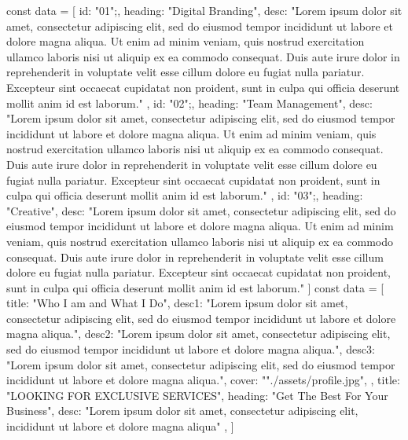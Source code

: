 const data = [
{
    id: "01";,
    heading: "Digital Branding",
    desc: "Lorem ipsum dolor sit amet, consectetur adipiscing elit, 
    sed do eiusmod tempor incididunt ut labore et dolore magna aliqua. 
    Ut enim ad minim veniam, quis nostrud exercitation ullamco laboris nisi 
    ut aliquip ex ea commodo consequat. Duis aute irure dolor in reprehenderit
     in voluptate velit esse cillum dolore eu fugiat nulla pariatur. 
     Excepteur sint occaecat cupidatat non proident, sunt in culpa qui
      officia deserunt mollit anim id est laborum."
},
{
    id: "02";,
    heading: "Team Management",
    desc: "Lorem ipsum dolor sit amet, consectetur adipiscing elit, 
    sed do eiusmod tempor incididunt ut labore et dolore magna aliqua. 
    Ut enim ad minim veniam, quis nostrud exercitation ullamco laboris nisi 
    ut aliquip ex ea commodo consequat. Duis aute irure dolor in reprehenderit
     in voluptate velit esse cillum dolore eu fugiat nulla pariatur. 
     Excepteur sint occaecat cupidatat non proident, sunt in culpa qui
      officia deserunt mollit anim id est laborum."
},
{
    id: "03";,
    heading: "Creative",
    desc: "Lorem ipsum dolor sit amet, consectetur adipiscing elit, 
    sed do eiusmod tempor incididunt ut labore et dolore magna aliqua. 
    Ut enim ad minim veniam, quis nostrud exercitation ullamco laboris nisi 
    ut aliquip ex ea commodo consequat. Duis aute irure dolor in reprehenderit
     in voluptate velit esse cillum dolore eu fugiat nulla pariatur. 
     Excepteur sint occaecat cupidatat non proident, sunt in culpa qui
      officia deserunt mollit anim id est laborum."
}
]
const data = [
    {
        title: "Who I am and What I Do",
        desc1: "Lorem ipsum dolor sit amet, consectetur adipiscing elit, 
        sed do eiusmod tempor incididunt ut labore et dolore magna aliqua.",
        desc2: "Lorem ipsum dolor sit amet, consectetur adipiscing elit, 
        sed do eiusmod tempor incididunt ut labore et dolore magna aliqua.",
        desc3: "Lorem ipsum dolor sit amet, consectetur adipiscing elit, 
        sed do eiusmod tempor incididunt ut labore et dolore magna aliqua.",
        cover: ""./assets/profile.jpg",
    },
    {
        title: "LOOKING FOR EXCLUSIVE SERVICES",
        heading: "Get The Best For Your Business",
        desc: "Lorem ipsum dolor sit amet, consectetur adipiscing elit, incididunt ut labore et dolore magna aliqua"
    },
]